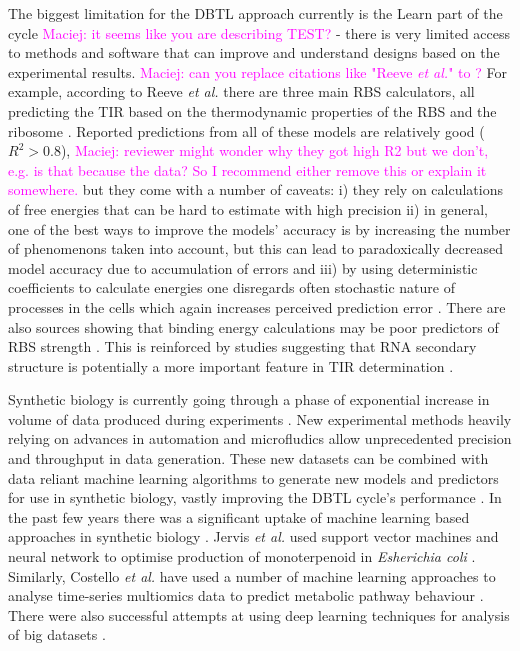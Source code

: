 \documentclass{article}
\newcommand{\mengyan}[1]{\textcolor{magenta}{#1}}
\begin{document}
The biggest limitation for the DBTL approach currently is the Learn part of the cycle \mengyan{Maciej: it seems like you are describing TEST?} - there is very limited access to methods and software that can improve and understand designs based on the experimental results.
\mengyan{Maciej: can you replace citations like "Reeve \emph{et al.}" to \textcite{Reeve2014}?}
For example, according to Reeve \emph{et al.} there are three main RBS calculators, all predicting the TIR based on the thermodynamic properties of the RBS and the ribosome \cite{Seo2013,Na2010,Salis2009}. 
Reported predictions from all of these models are relatively good ($R^2 >0.8$), \mengyan{Maciej: reviewer might wonder why they got high R2 but we don't, e.g. is that because the data? So I recommend either remove this or explain it somewhere.}
but they come with a number of caveats: i) they rely on calculations of free energies that can be hard to estimate with high precision ii) in general, one of the best ways to improve the models' accuracy is by increasing the number of phenomenons taken into account, but this can lead to paradoxically decreased model accuracy due to accumulation of errors \cite{EspahBorujeni2016} and iii) by using deterministic coefficients to calculate energies one disregards often stochastic nature of processes in the cells which again increases perceived prediction error \cite{Goss1998}. 
There are also sources showing that binding energy calculations may be poor predictors of RBS strength \cite{Saito2020,Sherer1980} . This is reinforced by studies suggesting that RNA secondary structure is potentially a more important feature in TIR determination \cite{DESMIT1994,EspahBorujeni2016} .

Synthetic biology is currently going through a phase of exponential increase in volume of data produced during experiments \cite{Freemont2019}. 
New experimental methods heavily relying on advances in automation and microfludics allow unprecedented precision and throughput in data generation.
These new datasets can be combined with data reliant machine learning algorithms to generate new models and predictors for use in synthetic biology, vastly improving the DBTL cycle's performance \cite{Camacho2018}. 
In the past few years there was a significant uptake of machine learning based approaches in synthetic biology \cite{LAWSON2021}.
Jervis \emph{et al.} used support vector machines and neural network to optimise production of monoterpenoid in \emph{Esherichia coli} \cite{Jervis2019}.
Similarly, Costello \emph{et al.} have used a number of machine learning approaches to analyse time-series multiomics data to predict metabolic pathway behaviour \cite{Costello2018}.
There were also successful attempts at using deep learning techniques for analysis of big datasets \cite{Alipanahi2015,Angermueller2016}. 
\end{document}

